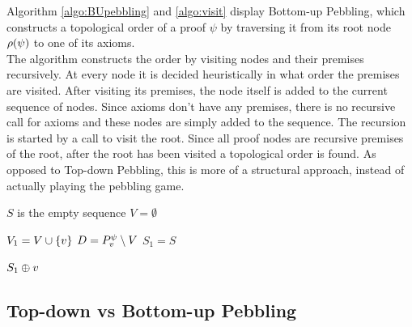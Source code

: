 \documentclass{llncs}
\begin{document}
Algorithm \ref{algo:BUpebbling} and \ref{algo:visit} display Bottom-up Pebbling, which constructs a topological order of a proof $\psi$ by traversing it from its root node $\rho(\psi)$ to one of its axioms.\\
The algorithm constructs the order by visiting nodes and their premises recursively. 
At every node it is decided heuristically in what order the premises are visited.
After visiting its premises, the node itself is added to the current sequence of nodes.
Since axioms don't have any premises, there is no recursive call for axioms and these nodes are simply added to the sequence.
The recursion is started by a call to visit the root.
Since all proof nodes are recursive premises of the root, after the root has been visited a topological order is found.
As opposed to Top-down Pebbling, this is more of a structural approach, instead of actually playing the pebbling game.


\begin{algorithm}[h]
  \BlankLine

	$S$ is the empty sequence\;
	$V = \emptyset$\;
	\Return {}\;

  \caption[.]{}
  \label{algo:BUpebbling}
\end{algorithm}

\begin{algorithm}[h]
	
	$V_1 = V \cup \{v\}$\;
	$D = P_{v}^{\psi} \setminus V$\;
	$S_1 = S$
	
	
	\Return $S_1 \oplus v$\;
	
  \caption[.]{}
  \label{algo:visit}
\end{algorithm}

\subsection{Top-down vs Bottom-up Pebbling} %
\end{document}
